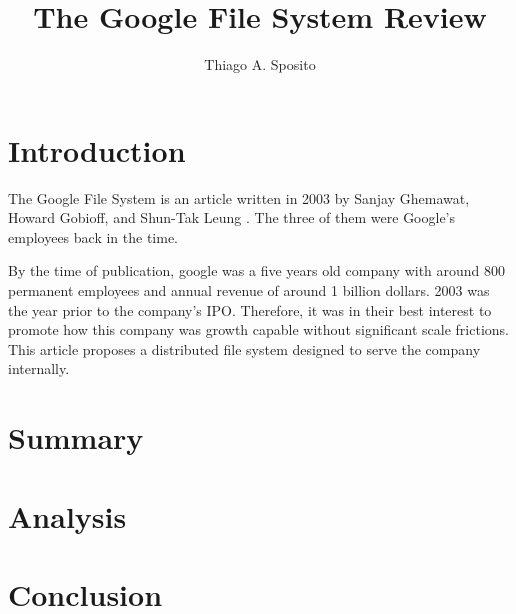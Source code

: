 \documentclass[12pt]{article}
\title{The Google File System Review}
\author{Thiago A. Sposito\inst{1} }
\begin{document}
 

\maketitle


\section{Introduction}

The Google File System is an article written in 2003 by Sanjay Ghemawat, Howard Gobioff, and Shun-Tak Leung \cite{ghemawat2003google}. The three of them were Google's employees back in the time.

By the time of publication, google was a five years old company with around 800 permanent employees \cite{google_coorp_info} and annual revenue of around 1 billion dollars. 2003 was the year prior to the company's IPO\cite{katje_2020}. Therefore, it was in their best interest to promote how this company was growth capable without significant scale frictions. This article proposes a distributed file system designed to serve the company internally.

\section{Summary} 



\section{Analysis}




\section{Conclusion}






\end{document}
